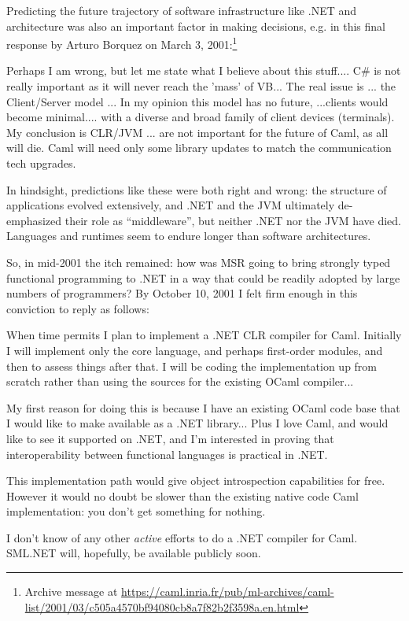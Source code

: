 \documentclass[acmsmall,review]{acmart}\settopmatter{printfolios=true,printccs=false,printacmref=false}
\begin{document}
Predicting the future trajectory of software infrastructure like .NET and architecture was also an important factor in making decisions, e.g. in this final response by Arturo Borquez on March 3, 2001:\footnote{Archive message at \url{https://caml.inria.fr/pub/ml-archives/caml-list/2001/03/c505a4570bf94080cb8a7f82b2f3598a.en.html}}
\begin{verbquote}
Perhaps I am wrong, but let me state what I believe about this stuff.... C\# is not really important as it will never reach the 'mass' of VB... The real issue is ... the Client/Server model ... In my opinion this model has no future, ...clients would become minimal.... with a diverse and broad family of client devices (terminals). My conclusion is CLR/JVM ... are not important for the future of Caml, as all will die. Caml will need only some library updates to match the communication tech upgrades.  
\end{verbquote}
In hindsight, predictions like these were both right and wrong: the structure of applications evolved extensively, and .NET and the JVM ultimately de-emphasized their role as “middleware”, but neither .NET nor the JVM have died.  Languages and runtimes seem to endure longer than software architectures.

So, in mid-2001 the itch remained: how was MSR going to bring strongly typed functional programming to .NET in a way that could be readily adopted by large numbers of programmers?  By October 10, 2001 I felt firm enough in this conviction to reply as follows:

\begin{verbquote}
When time permits I plan to implement a .NET CLR compiler for Caml. Initially I will implement only the core language, and perhaps first-order modules, and then to assess things after that.  I will be coding the implementation up from scratch rather than using the sources for the existing OCaml compiler...

My first reason for doing this is because I have an existing OCaml code base that I would like to make available as a .NET library...  Plus I love Caml, and would like to see it supported on .NET, and I'm interested in proving that interoperability between functional languages is practical in .NET. 

This implementation path would give object introspection capabilities for free.  However it would no doubt be slower than the existing native code Caml implementation: you don't get something for nothing.

I don't know of any other \emph{active} efforts to do a .NET compiler for Caml.  SML.NET will, hopefully, be available publicly soon.
\end{verbquote}
\end{document}
